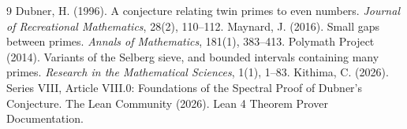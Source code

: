 \documentclass[11pt,a4paper]{article}
\begin{document}

\begin{thebibliography}{9}
  Dubner, H. (1996). A conjecture relating twin primes to even numbers. \emph{Journal of Recreational Mathematics}, 28(2), 110–112.
  Maynard, J. (2016). Small gaps between primes. \emph{Annals of Mathematics}, 181(1), 383–413.
  Polymath Project (2014). Variants of the Selberg sieve, and bounded intervals containing many primes. \emph{Research in the Mathematical Sciences}, 1(1), 1–83.
  Kithima, C. (2026). Series VIII, Article VIII.0: Foundations of the Spectral Proof of Dubner's Conjecture.
  The Lean Community (2026). Lean 4 Theorem Prover Documentation.
\end{thebibliography}
\end{document}
